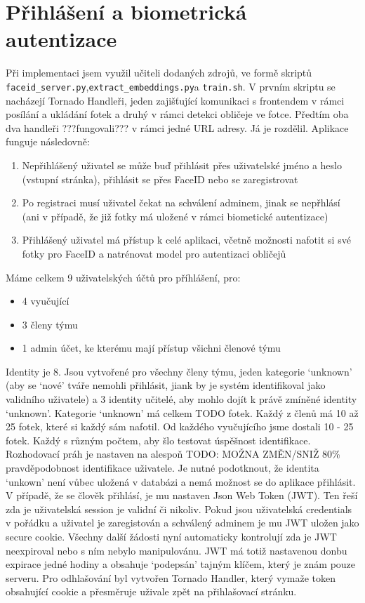 \section{Přihlášení a biometrická autentizace}
Při implementaci jsem využil učiteli dodaných zdrojů, ve formě skriptů \verb|faceid_server.py|,\newline \verb|extract_embeddings.py|a \verb|train.sh|.
V prvním skriptu se nacházejí Tornado Handleři, jeden zajišťující komunikaci s frontendem v rámci posílání a ukládání fotek a druhý v rámci detekci obličeje ve fotce.
Předtím oba dva handleři ???fungovali??? v rámci jedné URL adresy. Já je rozdělil. Aplikace funguje následovně:
\begin{enumerate}
    \item Nepřihlášený uživatel se může buď přihlásit přes uživatelské jméno a heslo (vstupní stránka), přihlásit se přes FaceID nebo se zaregistrovat
    \item Po registraci musí uživatel čekat na schválení adminem, jinak se nepřhlásí (ani v případě, že již fotky má uložené v rámci biometické autentizace)
    \item Přihlášený uživatel má přístup k celé aplikaci, včetně možnosti nafotit si své fotky pro FaceID a natrénovat model pro autentizaci obličejů
\end{enumerate} 

Máme celkem 9 uživatelských účtů pro příhlášení, pro: 
\begin{itemize}
    \item 4 vyučující%
    \item 3 členy týmu
    \item 1 admin účet, ke kterému mají přístup všichni členové týmu
\end{itemize}
Identity je 8. Jsou vytvořené pro všechny členy týmu, jeden kategorie `unknown' (aby se `nové' tváře nemohli přihlásit, jiank by je systém identifikoval jako validního uživatele) a 3 identity učitelé, aby mohlo dojít k právě zmíněné identity `unknown'.
Kategorie `unknown' má celkem TODO fotek.
Každý z členů má 10 až 25 fotek, které si každý sám nafotil.
Od každého vyučujícího jsme dostali 10 - 25 fotek. Každý s různým počtem, aby šlo testovat úspěšnost identifikace.
Rozhodovací práh je nastaven na alespoň TODO: MOŽNA ZMĚN/SNIŽ 80\% pravděpodobnost identifikace uživatele. 
Je nutné podotknout, že identita `unkown' není vůbec uložená v databázi a nemá možnost se do aplikace přihlásit.
V případě, že se člověk přihlásí, je mu nastaven Json Web Token (JWT). Ten řeší zda je uživatelská session je validní či nikoliv.
Pokud jsou uživatelská credentials v pořádku a uživatel je zaregistován a schválený adminem je mu JWT uložen jako secure cookie.
Všechny další žádosti nyní automaticky kontrolují zda je JWT neexpiroval nebo s ním nebylo manipulovánu. 
JWT má totiž nastavenou donbu expirace jedné hodiny a obsahuje `podepsán' tajným klíčem, který je znám pouze serveru.  
Pro odhlašování byl vytvořen Tornado Handler, který vymaže token obsahující cookie a přesměruje uživale zpět na přihlašovací stránku.
